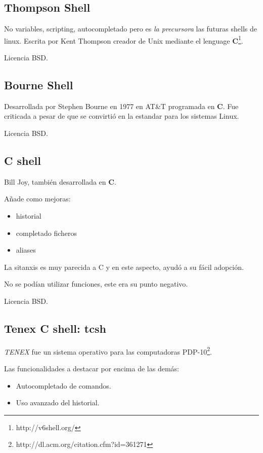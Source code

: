 \documentclass{scrartcl}
\begin{document}
\subsection{Thompson Shell}

No variables, scripting, autocompletado pero es \emph{la precursora} las futuras shells de linux.
Escrita por Kent Thompson creador de Unix mediante el lenguage \textbf{C}\footnote{http://v6shell.org/}.

Licencia BSD.

\subsection{Bourne Shell}

Desarrollada por Stephen Bourne en 1977 en AT\&T programada en \textbf{C}.
Fue criticada a pesar de que se convirti\'o en la estandar para los sistemas Linux.

Licencia BSD.

\subsection{C shell}

Bill Joy, tambi\'en desarrollada en \textbf{C}.

A\~nade como mejoras:
\begin{itemize}
	\item historial
	\item completado ficheros
    \item aliases
\end{itemize}

\par La sitanxis es muy parecida a C y en este aspecto, ayud\'o a su f\'acil adopci\'on. 

\par No se pod\'ian utilizar funciones, este era su punto negativo.

\par Licencia BSD.

\subsection{Tenex C shell: tcsh}

\emph{TENEX} fue un sistema operativo para las computadoras PDP-10\footnote{http://dl.acm.org/citation.cfm?id=361271}.

\par Las funcionalidades a destacar por encima de las dem\'as:
\begin{itemize}
	\item Autocompletado de comandos.
	\item Uso avanzado del historial.
\end{itemize}
\end{document}
